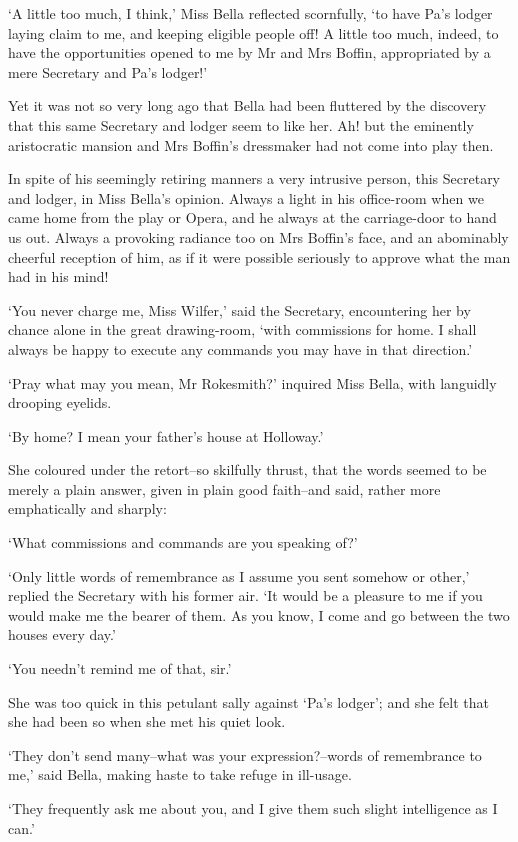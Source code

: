 ‘A little too much, I think,’ Miss Bella reflected scornfully, ‘to
have Pa’s lodger laying claim to me, and keeping eligible people off!
A little too much, indeed, to have the opportunities opened to me by Mr
and Mrs Boffin, appropriated by a mere Secretary and Pa’s lodger!’

Yet it was not so very long ago that Bella had been fluttered by the
discovery that this same Secretary and lodger seem to like her. Ah! but
the eminently aristocratic mansion and Mrs Boffin’s dressmaker had not
come into play then.

In spite of his seemingly retiring manners a very intrusive person, this
Secretary and lodger, in Miss Bella’s opinion. Always a light in his
office-room when we came home from the play or Opera, and he always at
the carriage-door to hand us out. Always a provoking radiance too on
Mrs Boffin’s face, and an abominably cheerful reception of him, as if it
were possible seriously to approve what the man had in his mind!

‘You never charge me, Miss Wilfer,’ said the Secretary, encountering her
by chance alone in the great drawing-room, ‘with commissions for home.
I shall always be happy to execute any commands you may have in that
direction.’

‘Pray what may you mean, Mr Rokesmith?’ inquired Miss Bella, with
languidly drooping eyelids.

‘By home? I mean your father’s house at Holloway.’

She coloured under the retort--so skilfully thrust, that the words
seemed to be merely a plain answer, given in plain good faith--and said,
rather more emphatically and sharply:

‘What commissions and commands are you speaking of?’

‘Only little words of remembrance as I assume you sent somehow or
other,’ replied the Secretary with his former air. ‘It would be a
pleasure to me if you would make me the bearer of them. As you know, I
come and go between the two houses every day.’

‘You needn’t remind me of that, sir.’

She was too quick in this petulant sally against ‘Pa’s lodger’; and she
felt that she had been so when she met his quiet look.

‘They don’t send many--what was your expression?--words of remembrance
to me,’ said Bella, making haste to take refuge in ill-usage.

‘They frequently ask me about you, and I give them such slight
intelligence as I can.’

